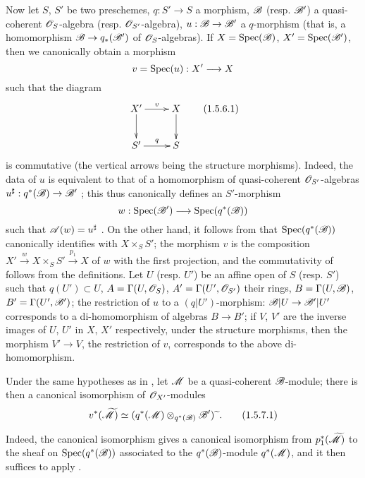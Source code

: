 \begin{env}[1.5.6]
\label{II.1.5.6}
Now let $S$, $S'$ be two preschemes, $q:S'\to S$ a morphism, $\mathscr{B}$ (resp. $\mathscr{B}'$) a quasi-coherent $\mathscr{O}_S$-algebra (resp. $\mathscr{O}_{S'}$-algebra), $u:\sh{B}\to\sh{B}'$ a $q$-morphism (that is, a homomorphism $\sh{B}\to q_*(\sh{B}')$ of $\mathscr{O}_S$-algebras).
If $X=\operatorname{Spec}(\mathscr{B})$, $X'=\operatorname{Spec}(\mathscr{B}')$, then we canonically obtain a morphism
\[
  v=\Spec(u):X'\to X
\]
such that the diagram
\[
\label{II.1.5.6.1}
  \xymatrix{
    X'\ar[r]^-{v}\ar[d] & X\ar[d]\\
    S'\ar[r]^-{q} & S
  }
  \tag{1.5.6.1}
\]
is commutative (the vertical arrows being the structure morphisms).
Indeed, the data of $u$ is equivalent to that of a homomorphism of quasi-coherent $\mathscr{O}_{S'}$-algebras $u^\sharp:q^*(\sh{B})\to\sh{B}'$ ; this thus canonically defines an $S'$-morphism
\[
  w:\Spec(\sh{B}')\to\Spec(q^*(\sh{B}))
\]
such that $\mathscr{A}(w)=u^\sharp$ .
On the other hand, it follows from  that $\operatorname{Spec}(q^*(\mathscr{B}))$ canonically identifies with $X\times_S S'$; the morphism $v$ is the composition $X'\xrightarrow{w}X\times_S S'\xrightarrow{p_1}X$ of $w$ with the first projection, and the commutativity of  follows from the definitions.
Let $U$ (resp. $U'$) be an affine open of $S$ (resp. $S'$) such that $q(U')\subset U$, $A=\Gamma(U,\mathscr{O}_S)$, $A'=\Gamma(U',\mathscr{O}_{S'})$ their rings, $B=\Gamma(U,\mathscr{B})$, $B'=\Gamma(U',\mathscr{B}')$; the restriction of $u$ to a $(q|U')$-morphism: $\sh{B}|U\to\sh{B}'|U'$ corresponds to a di-homomorphism of algebras $B\to B'$; if $V$, $V'$ are the inverse images of $U$, $U'$ in $X$, $X'$ respectively, under the structure morphisms, then the morphism $V'\to V$, the restriction of $v$, corresponds  to the above di-homomorphism.
\end{env}

\begin{env}[1.5.7]
\label{II.1.5.7}
Under the same hypotheses as in , let $\mathscr{M}$ be a quasi-coherent $\mathscr{B}$-module; there is then a canonical isomorphism of $\mathscr{O}_{X'}$-modules
\[
\label{II.1.5.7.1}
  v^*(\widetilde{\mathscr{M}})\simeq(q^*(\mathscr{M})\otimes_{q^*(\mathscr{B})}\mathscr{B}'){\,\widetilde{\,}\,}.
  \tag{1.5.7.1}
\]

Indeed, the canonical isomorphism  gives a canonical isomorphism from $p_1^*(\widetilde{\mathscr{M}})$ to the sheaf on $\operatorname{Spec}(q^*(\mathscr{B}))$ associated to the $q^*(\mathscr{B})$-module $q^*(\mathscr{M})$, and it then suffices to apply .
\end{env}

